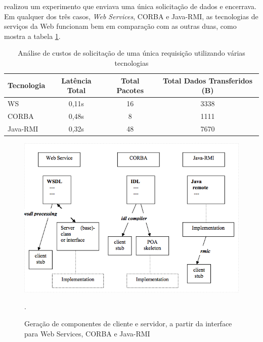 \documentclass[
	12pt,				%
	oneside,			%
	a4paper,			%
	english,			%
	brazil				%
	]{abntex2ppgsi}
\begin{document}
 realizou um experimento que enviava uma única solicitação de dados e encerrava. Em qualquer dos três casos, \textit{Web Services}, CORBA e Java-RMI, as tecnologias de serviços da Web funcionam bem em comparação com as outras duas, como mostra a tabela \ref{tbComparacaoWS_CORBA_RMI}.

\begin{table}[h!]
	\centering
	\caption{Análise de custos de solicitação de uma única requisição utilizando várias tecnologias\cite{gray2004comparison} }
	\label{tbComparacaoWS_CORBA_RMI}
	\begin{tabular}{|l | c|c|c|}
		\hline
		\rowcolor[gray]{0.7}
		Tecnologia & Latência Total  & Total Pacotes  & Total Dados Transferidos (B)  \\ \hline
		WS              & 0,11s & 16 & 3338  \\ \hline
		CORBA        & 0,48s & 8 & 1111  \\ \hline
		Java-RMI     & 0,32s & 48 & 7670  \\ \hline
	\end{tabular}
\end{table}


\begin{figure}[h!]
	\centering
	\includegraphics[width=0.8\columnwidth]{images/estrutura_comunicacao.png}
	\caption{Geração de componentes de cliente e servidor, a partir da interface para Web Services, CORBA e Java-RMI \cite{gray2004comparison}}.
	\label{fig:estrutura_comunicacao}
\end{figure}
\end{document}
